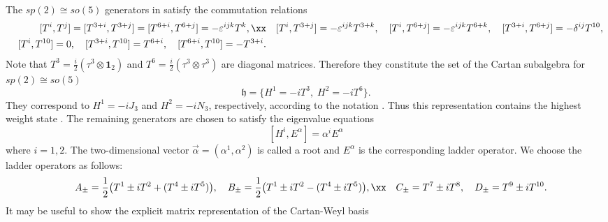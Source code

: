 \documentclass[12pt,epsf]{article}
\begin{document}
The $sp(2) \cong so(5)$ generators in  satisfy the commutation relations
\begin{eqnarray}\label{sp2-comm}
  && [T^{i}, T^{j}] = [T^{3+i}, T^{3+j}] = [T^{6+i}, T^{6+j}] = - \varepsilon^{ijk} T^{k}, \xx
  && [T^{i}, T^{3+j}] = - \varepsilon^{ijk} T^{3+k}, \quad [T^{i}, T^{6+j}] = - \varepsilon^{ijk} T^{6+k},
   \quad [T^{3+i}, T^{6+j}] = - \delta^{ij} T^{10}, \\
  && [T^{i}, T^{10}] = 0, \quad [T^{3+i}, T^{10}] = T^{6+i}, \quad [T^{6+i}, T^{10}] = - T^{3+i}. \nonumber
\end{eqnarray}
Note that $T^3 = \frac{i}{2}(\tau^3 \otimes \mathbf{1}_2)$ and $T^6 = \frac{i}{2}(\tau^3 \otimes \tau^3)$ are diagonal matrices.
Therefore they constitute the set of the Cartan subalgebra for $sp(2) \cong so(5)$
\begin{equation}\label{cartan}
  \mathfrak{h} = \{ H^1 = - i T^3, \; H^2 = - iT^6 \}.
\end{equation}
They correspond to $H^1 = - i J_3$ and $H^2 = - iN_3$, respectively, according to the notation .
Thus this representation contains the highest weight state .
The remaining generators are chosen to satisfy the eigenvalue equations \cite{georgi-book,book-wybo}
\begin{equation}\label{root-eq}
  [ H^i, E^\alpha ] = \alpha^i E^\alpha
\end{equation}
where $i=1,2$. The two-dimensional vector $\vec{\alpha} = (\alpha^1, \alpha^2)$ is called a root
and $E^\alpha$ is the corresponding ladder operator.
We choose the ladder operators as follows:
\begin{eqnarray}\label{ladder}
  && A_\pm = \frac{1}{2} \big( T^1 \pm i T^2 + (T^4 \pm i T^5)\big), \quad
  B_\pm = \frac{1}{2} \big( T^1 \pm i T^2 - (T^4 \pm i T^5) \big), \xx
  && C_\pm = T^7 \pm i T^8, \quad
  D_\pm = T^9 \pm i T^{10}.
\end{eqnarray}
It may be useful to show the explicit matrix representation of the Cartan-Weyl basis
\end{document}
